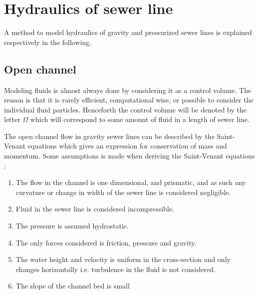 ﻿\section{Hydraulics of sewer line}\label{se:hydraulics_of_sewer_line}
A method to model hydraulics of gravity and pressurized sewer lines is explained respectively in the following. 

\subsection{Open channel}\label{subse:open_channel}
Modeling fluids is almost always done by considering it as a control volume. The reason is that it is rarely efficient, computational wise, or possible to consider the individual fluid particles.
Henceforth the control volume will be denoted by the letter $\Omega$ which will correspond to some amount of fluid in a length of sewer line.		

The open channel flow in gravity sewer lines can be described by the Saint-Venant equations which gives an expression for conservation of mass and momentum.
Some assumptions is made when deriving the Saint-Venant equations \cite{schutze2011modelling}:

\begin{table}[H]
\begin{enumerate}
\item The flow in the channel is one dimensional, and prismatic, and as such any curvature or change in width of the sewer line is considered negligible.
\item Fluid in the sewer line is considered incompressible. 
\item The pressure is assumed hydrostatic.
\item The only forces considered is friction, pressure and gravity.
\item The water height and velocity is uniform in the cross-section and only changes horizontally i.e. turbulence in the fluid is not considered.
\item The slope of the channel bed is small
\end{enumerate}
\label{tab:saintbernard_assumptions}
\end{table}

